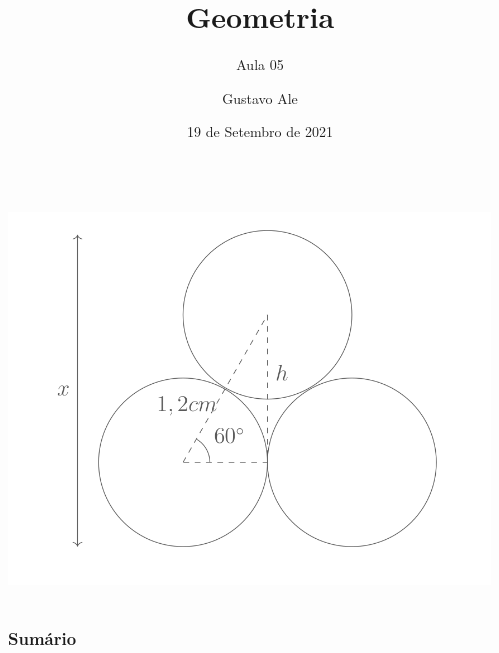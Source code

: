 \documentclass[handout]{beamer}
\title{Geometria} %
\subtitle{Aula 05}
\author{Gustavo Ale} %
\institute[UFMT] %
{
EduCursinho - Faculdade de Engenharia \\ %
\medskip
\textit{gustavo.engca@gmail.com} %
}
\date{19 de Setembro de 2021} %
\begin{document}
{
\begin{frame}
    \begin{columns}
        \begin{column}{0.48\textwidth}
            \includegraphics[width=\columnwidth,left]{../assets/geo.png}
        \end{column}
        \begin{column}{0.48\textwidth}
            \titlepage
        \end{column}
    \end{columns}

\end{frame}
}


\begin{frame}
    \frametitle{Sumário} %
    \tableofcontents %
\end{frame}
\end{document}
